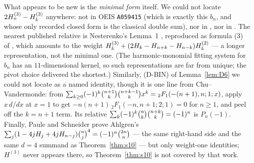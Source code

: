 What appears to be new is the \emph{minimal form} itself. We could not locate
$2H^{(3)}_{n}-H^{(3)}_{k}$ anywhere: not in OEIS \texttt{A059415} (which is exactly this $b_n$, and
whose only recorded closed form is the classical double sum), nor in
\cite{ChamStraub,Gorodetsky,Straub1401,Cooper2302}, nor in
\cite{vdPoorten1979,Schneider2007,Fischler2004,
PauleSchneider2003}. The nearest published relative is Nesterenko's Lemma~1
\cite{Nesterenko1996}, reproduced as formula (3) of \cite{Zudilin0202159},
which amounts to the weight $H^{(3)}_{k}+(2H_k-H_{n+k}-H_{n-k})H^{(2)}_{k}$ --- a longer
representation, not the minimal one. (The harmonic-monomial fitting system for $b_n$ has
an $11$-dimensional kernel, so such representations are far from unique; the pivot choice
delivered the shortest.) Similarly, (D-BIN) of Lemma~\ref{lem:D6} we could not locate as a
named identity, though it is one line from Chu--Vandermonde: from
$\sum_{k\ge0}(-1)^k\binom{n+1}{k}\binom{n+k-1}{k}x^k={}_2F_1(-(n+1),n;1;x)$, apply $x\,d/dx$ at
$x=1$ to get $-n(n+1)\,{}_2F_1(-n,n+1;2;1)=0$ for $n\ge1$, and peel off the $k=n+1$ term.
Its relative $\sum_k(-1)^k\binom{n}{k}\binom{n+k}{k}=(-1)^n$ is $P_n(-1)$. Finally, Paule and
Schneider \cite{PauleSchneider2003} prove Ahlgren's
$\sum_j(1-4jH_j+4jH_{n-j})\binom{n}{j}^4=(-1)^n\binom{2n}{n}$ --- the same right-hand side and the
same $d=4$ summand as Theorem~\ref{thm:s10} --- but only weight-one identities;
$H^{(3)}$ never appears there, so Theorem~\ref{thm:s10} is not covered by that work.
